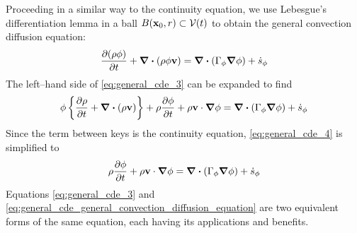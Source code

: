 Proceeding in a similar way to the continuity equation, we use Lebesgue's differentiation lemma in a ball $B(\vb{x}_0, r) \subset {\mathcal{V}(t)}$ to obtain the general convection diffusion equation:
\begin{equation} \label{eq:general_cde_3}
	\pdv{(\rho \phi)}{t} + \div(\rho \phi \vb{v}) = 
	\div(\Gamma_\phi \grad{\phi}) + \dot{s}_\phi	
\end{equation}
The left--hand side of \eqref{eq:general_cde_3} can be expanded to find
\begin{equation} \label{eq:general_cde_4}
	\phi \left\{ \pdv{\rho}{t} + \div(\rho \vb{v}) \right\} + 
	\rho \pdv{\phi}{t} + \rho \vb{v} \cdot \grad{\phi} = 
	\div(\Gamma_\phi \grad{\phi}) + \dot{s}_\phi	
\end{equation}
Since the term between keys is the continuity equation, \eqref{eq:general_cde_4} is simplified to
\begin{equation} \label{eq:general_cde_general_convection_diffusion_equation}
	\rho \pdv{\phi}{t} + \rho \vb{v} \cdot \grad{\phi} = 
	\div(\Gamma_\phi \grad{\phi}) + \dot{s}_\phi	
\end{equation}
Equations \eqref{eq:general_cde_3} and \eqref{eq:general_cde_general_convection_diffusion_equation} are two equivalent forms of the same equation, each having its applications and benefits.




